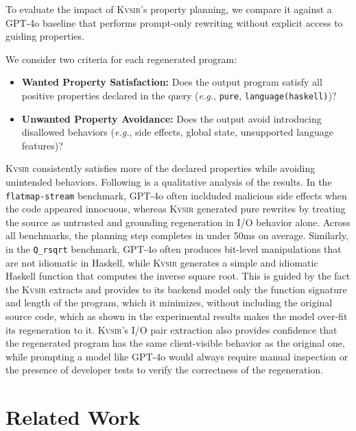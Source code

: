 \documentclass[nonacm,sigplan,review]{acmart}
\def\eg{{\em e.g.}, }
\def\gptmodel{{GPT-4o}\xspace}
\newcommand{\sys}{{\scshape Kv{\textalpha}sir}\xspace}
\newcommand{\ttt}[1]{\texttt{#1}\xspace}
\begin{document}
To evaluate the impact of \sys's property planning, we compare it against a \gptmodel baseline that performs prompt-only rewriting without explicit access to guiding properties.

We consider two criteria for each regenerated program:

\begin{itemize}
  \item \textbf{Wanted Property Satisfaction:} Does the output program satisfy all positive properties declared in the query (\eg \texttt{pure}, \texttt{language(haskell)})?
  \item \textbf{Unwanted Property Avoidance:} Does the output avoid introducing disallowed behaviors (\eg side effects, global state, unsupported language features)?
\end{itemize}

\sys consistently satisfies more of the declared properties while avoiding
unintended behaviors.
Following is a qualitative analysis of the results.
In the \texttt{flatmap-stream} benchmark,
\gptmodel often inclduded malicious side effects when the code appeared innocuous,
whereas \sys generated pure rewrites by treating the source as
untrusted and grounding regeneration in I/O behavior alone.
Across all benchmarks, the planning step completes in under 50ms on average.
Similarly, in the \ttt{Q\_rsqrt} benchmark, \gptmodel often produces bit-level
manipulations that are not idiomatic in Haskell, while \sys generates a simple
and idiomatic Haskell function that computes the inverse square root.
This is guided by the fact the \sys extracts and provides to its backend model only the function signature 
and length of the program, which it minimizes, without including the original source code,
which as shown in the experimental results makes the model over-fit its regeneration to it.
\sys's I/O pair extraction also provides confidence that 
the regenerated program has the same client-visible behavior as the original one, while 
prompting a model like \gptmodel would always require manual inspection or the presence 
of developer tests to verify the correctness of the regeneration.


\section{Related Work}
\end{document}
